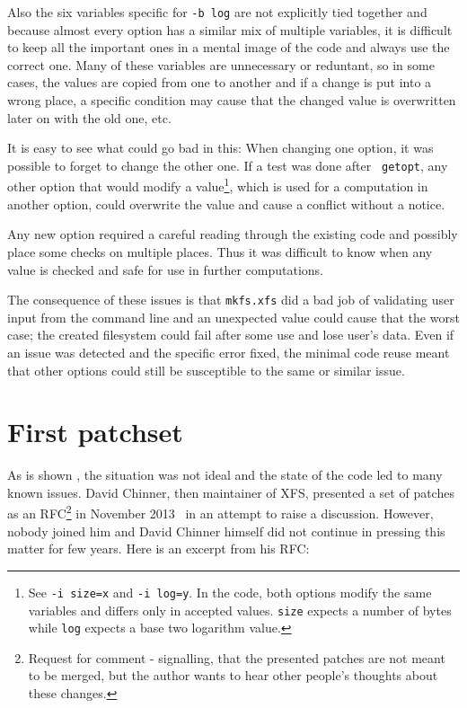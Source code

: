 Also the six variables specific for {\tt -b log} are not explicitly tied
together and because almost every option has a similar mix of multiple
variables, it is difficult to keep all the important ones in a mental image
of the code and always use the correct one. Many of these variables are
unnecessary or reduntant, so in some cases, the values are copied from one
to another and if a change is put into a wrong place, a specific condition
may cause that the changed value is overwritten later on with the old one,
etc.

It is easy to see what could go bad in this: When changing one option, it was
possible to forget to change the other one. If a test was done after {\tt
getopt}, any other option that would modify a value\footnote{See {\tt -i
size=x} and {\tt -i log=y}. In the code, both options modify the same variables
and differs only in accepted values. {\tt size} expects a number of bytes while
{\tt log} expects a base two logarithm value.}, which is used for a computation
in another option, could overwrite the value and cause a conflict without a
notice.

Any new option required a careful reading through the existing code and
possibly place some checks on multiple places. Thus it was difficult to know
when any value is checked and safe for use in further computations.


The consequence of these issues is that {\tt mkfs.xfs} did a bad job of
validating user input from the command line and an unexpected value could
cause that the worst case; the created filesystem could fail after some use
and lose user's data. Even if an issue was detected and the specific
error fixed, the minimal code reuse meant that other options could still be
susceptible to the same or similar issue.

\section{First patchset}\label{chap:refactoring:first}

As is shown , the situation was not ideal and the
state of the code led to many known issues. David Chinner, then maintainer
of XFS, presented a set of patches as an RFC\footnote{Request for comment -
	signalling, that the presented patches are not meant to be merged,
but the author wants to hear other people's thoughts about these changes.}
in November 2013~\cite{davidsPatches} in an attempt to raise a discussion.
However, nobody joined him and David Chinner himself did not continue in
pressing this matter for few years. Here is an excerpt from his RFC:

